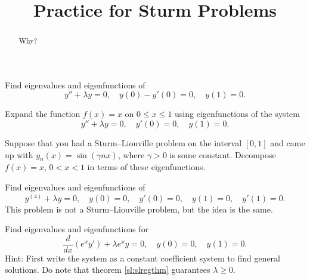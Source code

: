 \documentclass{ximera}
\title{Practice for Sturm Problems}
\begin{document}
\begin{abstract}
Why?
\end{abstract}
\maketitle


\begin{exercise}
    Find eigenvalues and eigenfunctions of
    \begin{equation*}
        y''+\lambda y = 0, \quad y(0)- y'(0) = 0, \quad y(1) = 0 .
    \end{equation*}
\end{exercise}

\begin{exercise}
    Expand the function $f(x) = x$ on $0 \leq x \leq 1$ using eigenfunctions of the system
    \begin{equation*}
        y'' + \lambda y = 0, \quad y'(0) = 0, \quad y(1) = 0 .
    \end{equation*}
\end{exercise}

\begin{exercise}
    Suppose that you had a Sturm--Liouville problem on the interval $[0,1]$ and came up with $y_n(x) = \sin (\gamma n x)$, where $\gamma > 0$ is some constant. Decompose $f(x) = x$, $0 < x < 1$ in terms of these eigenfunctions.
\end{exercise}

\begin{exercise}
    Find eigenvalues and eigenfunctions of
    \begin{equation*}
        y^{(4)}+\lambda y = 0, \quad y(0) = 0, \quad y'(0) = 0, \quad y(1) = 0, \quad y'(1) = 0 .
    \end{equation*}
    This problem is not a Sturm--Liouville problem, but the idea is the same.
\end{exercise}

\begin{exercise}%
    Find eigenvalues and eigenfunctions for
    \begin{equation*}
        \frac{d}{dx} (e^x y') + \lambda e^x y = 0, \quad y(0) = 0, \quad y(1) = 0 .
    \end{equation*}
    Hint: First write the system as a constant coefficient system to find general solutions.  Do note that theorem \ref{sl:slregthm} guarantees $\lambda \geq 0$.
\end{exercise}
\end{document}
